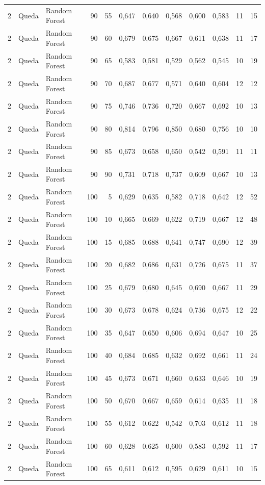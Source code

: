 \begin{longtable}{@{}rllrrrrrrrrr@{}}
2 & Queda & Random Forest & 90 & 55 & 0,647 & 0,640 & 0,568 & 0,600 & 0,583 & 11 & 15 \\
2 & Queda & Random Forest & 90 & 60 & 0,679 & 0,675 & 0,667 & 0,611 & 0,638 & 11 & 17 \\
2 & Queda & Random Forest & 90 & 65 & 0,583 & 0,581 & 0,529 & 0,562 & 0,545 & 10 & 19 \\
2 & Queda & Random Forest & 90 & 70 & 0,687 & 0,677 & 0,571 & 0,640 & 0,604 & 12 & 12 \\
2 & Queda & Random Forest & 90 & 75 & 0,746 & 0,736 & 0,720 & 0,667 & 0,692 & 10 & 13 \\
2 & Queda & Random Forest & 90 & 80 & 0,814 & 0,796 & 0,850 & 0,680 & 0,756 & 10 & 10 \\
2 & Queda & Random Forest & 90 & 85 & 0,673 & 0,658 & 0,650 & 0,542 & 0,591 & 11 & 11 \\
2 & Queda & Random Forest & 90 & 90 & 0,731 & 0,718 & 0,737 & 0,609 & 0,667 & 10 & 13 \\
2 & Queda & Random Forest & 100 & 5 & 0,629 & 0,635 & 0,582 & 0,718 & 0,642 & 12 & 52 \\
2 & Queda & Random Forest & 100 & 10 & 0,665 & 0,669 & 0,622 & 0,719 & 0,667 & 12 & 48 \\
2 & Queda & Random Forest & 100 & 15 & 0,685 & 0,688 & 0,641 & 0,747 & 0,690 & 12 & 39 \\
2 & Queda & Random Forest & 100 & 20 & 0,682 & 0,686 & 0,631 & 0,726 & 0,675 & 11 & 37 \\
2 & Queda & Random Forest & 100 & 25 & 0,679 & 0,680 & 0,645 & 0,690 & 0,667 & 11 & 29 \\
2 & Queda & Random Forest & 100 & 30 & 0,673 & 0,678 & 0,624 & 0,736 & 0,675 & 12 & 22 \\
2 & Queda & Random Forest & 100 & 35 & 0,647 & 0,650 & 0,606 & 0,694 & 0,647 & 10 & 25 \\
2 & Queda & Random Forest & 100 & 40 & 0,684 & 0,685 & 0,632 & 0,692 & 0,661 & 11 & 24 \\
2 & Queda & Random Forest & 100 & 45 & 0,673 & 0,671 & 0,660 & 0,633 & 0,646 & 10 & 19 \\
2 & Queda & Random Forest & 100 & 50 & 0,670 & 0,667 & 0,659 & 0,614 & 0,635 & 11 & 18 \\
2 & Queda & Random Forest & 100 & 55 & 0,612 & 0,622 & 0,542 & 0,703 & 0,612 & 11 & 18 \\
2 & Queda & Random Forest & 100 & 60 & 0,628 & 0,625 & 0,600 & 0,583 & 0,592 & 11 & 17 \\
2 & Queda & Random Forest & 100 & 65 & 0,611 & 0,612 & 0,595 & 0,629 & 0,611 & 10 & 15 \\

\end{longtable}
